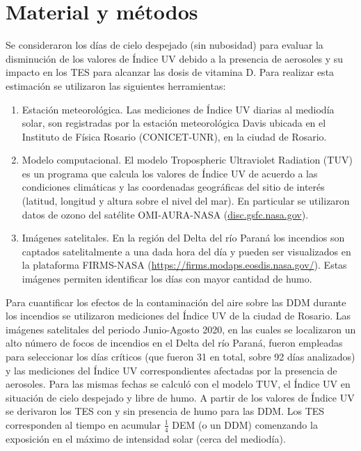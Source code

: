 \section*{Material y métodos}

Se consideraron los días de cielo despejado (sin nubosidad) para evaluar la disminución de los valores de Índice UV debido a la presencia de aerosoles y su impacto en los TES para alcanzar las dosis de vitamina D. Para realizar esta estimación se utilizaron las siguientes herramientas:

\begin{enumerate}
    \item Estación meteorológica. Las mediciones de Índice UV diarias al mediodía solar, son registradas por la estación meteorológica Davis ubicada en el Instituto de Física Rosario (CONICET-UNR), en la ciudad de Rosario.

    \item Modelo computacional. El modelo Tropospheric Ultraviolet Radiation (TUV) es un programa que calcula los valores de Índice UV de acuerdo a las condiciones climáticas y las coordenadas geográficas del sitio de interés (latitud, longitud y altura sobre el nivel del mar). En particular se utilizaron datos de ozono del satélite OMI-AURA-NASA (\url{disc.gsfc.nasa.gov}).

    \item Imágenes satelitales. En la región del Delta del río Paraná los incendios son captados satelitalmente a una dada hora del día y pueden ser visualizados en la plataforma FIRMS-NASA (\url{https://firms.modaps.eosdis.nasa.gov/}). Estas imágenes permiten identificar los días con mayor cantidad de humo.
\end{enumerate}

Para cuantificar los efectos de la contaminación del aire sobre las DDM durante los incendios se utilizaron mediciones del Índice UV de la ciudad de Rosario. Las imágenes satelitales del periodo Junio-Agosto 2020, en las cuales se localizaron un alto número de focos de incendios en el Delta del río Paraná, fueron empleadas para seleccionar los días críticos (que fueron 31 en total, sobre 92 días analizados) y las mediciones del Índice UV correspondientes afectadas por la presencia de aerosoles. Para las mismas fechas se calculó con el modelo TUV, el Índice UV en situación de cielo despejado y libre de humo. A partir de los valores de Índice UV se derivaron los TES con y sin presencia de humo para las DDM. Los TES corresponden al tiempo en acumular $\frac{1}{4}$ DEM (o un DDM) comenzando la exposición en el máximo de intensidad solar (cerca del mediodía).

